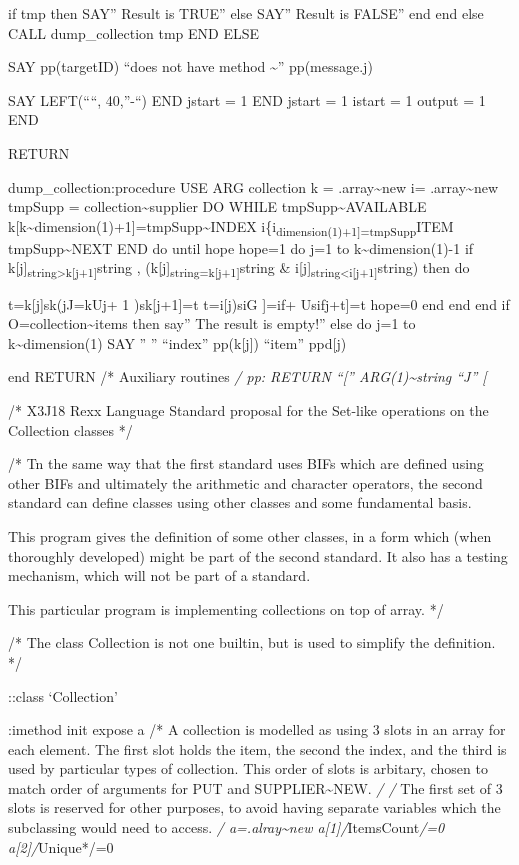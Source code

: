 if tmp then SAY'' Result is TRUE'' else SAY'' Result is FALSE'' end end
else CALL dump\_collection tmp END ELSE

SAY pp(targetID) ``does not have method \textasciitilde{}''
pp(message.j)

SAY LEFT(````, 40,''-``) END jstart = 1 END jstart = 1 istart = 1 output
= 1 END

RETURN

dump\_collection:procedure USE ARG collection k =
.array\textasciitilde new i= .array\textasciitilde new tmpSupp =
collection\textasciitilde supplier DO WHILE
tmpSupp\textasciitilde AVAILABLE
k{[}k\textasciitilde dimension(1)+1{]}=tmpSupp\textasciitilde INDEX
i\{i\textsubscript{dimension(1)+1{]}=tmpSupp}ITEM
tmpSupp\textasciitilde NEXT END do until hope hope=1 do j=1 to
k\textasciitilde dimension(1)-1 if
k{[}j{]}\textsubscript{string\textgreater k{[}j+1{]}}string \textbar,
(k{[}j{]}\textsubscript{string=k{[}j+1{]}}string \&
i{[}j{]}\textsubscript{string\textless i{[}j+1{]}}string) then do

t=k{[}j{]}sk(jJ=kUj+ 1 )sk{[}j+1{]}=t t=i{[}j)siG {]}=if+ Usifj+t{]}=t
hope=0 end end end if O=collection\textasciitilde items then say'' The
result is empty!'' else do j=1 to k\textasciitilde dimension(1) SAY ''
'' ``index'' pp(k{[}j{]}) ``item'' ppd{[}j)

end RETURN /* Auxiliary routines \emph{/ pp: RETURN ``{[}''
\textbar\textbar{} ARG(1)\textasciitilde string \textbar\textbar{} ``J''
{[}}

/* X3J18 Rexx Language Standard proposal for the Set-like operations on
the Collection classes */

/* Tn the same way that the first standard uses BIFs which are defined
using other BIFs and ultimately the arithmetic and character operators,
the second standard can define classes using other classes and some
fundamental basis.

This program gives the definition of some other classes, in a form which
(when thoroughly developed) might be part of the second standard. It
also has a testing mechanism, which will not be part of a standard.

This particular program is implementing collections on top of array. */

/* The class Collection is not one builtin, but is used to simplify the
definition. */

::class `Collection'

:imethod init expose a /* A collection is modelled as using 3 slots in
an array for each element. The first slot holds the item, the second the
index, and the third is used by particular types of collection. This
order of slots is arbitary, chosen to match order of arguments for PUT
and SUPPLIER\textasciitilde NEW. \emph{/ /} The first set of 3 slots is
reserved for other purposes, to avoid having separate variables which
the subclassing would need to access. \emph{/
a=.alray\textasciitilde new a{[}1{]}/}ItemsCount\emph{/=0
a{[}2{]}/}Unique*/=0

